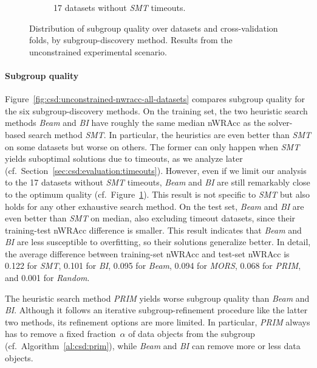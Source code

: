\documentclass{article}
\theoremstyle{definition}
\begin{document}
\begin{figure}[t]
\begin{subfigure}[t]{0.48\textwidth}
		\caption{17 datasets without \emph{SMT} timeouts.}
		\label{fig:csd:unconstrained-nwracc-no-timeout-datasets}
	\end{subfigure}
	\caption{
		Distribution of subgroup quality over datasets and cross-validation folds, by subgroup-discovery method.
		Results from the unconstrained experimental scenario.
	}
	\label{fig:csd:unconstrained-nwracc}
\end{figure}

\paragraph{Subgroup quality}

Figure~\ref{fig:csd:unconstrained-nwracc-all-datasets} compares subgroup quality for the six subgroup-discovery methods.
On the training set, the two heuristic search methods \emph{Beam} and \emph{BI} have roughly the same median nWRAcc as the solver-based search method \emph{SMT}.
In particular, the heuristics are even better than \emph{SMT} on some datasets but worse on others.
The former can only happen when \emph{SMT} yields suboptimal solutions due to timeouts, as we analyze later (cf.~Section~\ref{sec:csd:evaluation:timeouts}).
However, even if we limit our analysis to the 17 datasets without \emph{SMT} timeouts, \emph{Beam} and \emph{BI} are still remarkably close to the optimum quality (cf.~Figure~\ref{fig:csd:unconstrained-nwracc-no-timeout-datasets}).
This result is not specific to \emph{SMT} but also holds for any other exhaustive search method.
On the test set, \emph{Beam} and \emph{BI} are even better than \emph{SMT} on median, also excluding timeout datasets, since their training-test nWRAcc difference is smaller.
This result indicates that \emph{Beam} and \emph{BI} are less susceptible to overfitting, so their solutions generalize better.
In detail, the average difference between training-set nWRAcc and test-set nWRAcc is 0.122 for \emph{SMT}, 0.101 for \emph{BI}, 0.095 for \emph{Beam}, 0.094 for \emph{MORS}, 0.068 for \emph{PRIM}, and 0.001 for \emph{Random}.

The heuristic search method \emph{PRIM} yields worse subgroup quality than \emph{Beam} and \emph{BI}.
Although it follows an iterative subgroup-refinement procedure like the latter two methods, its refinement options are more limited.
In particular, \emph{PRIM} always has to remove a fixed fraction~$\alpha$ of data objects from the subgroup (cf.~Algorithm~\ref{al:csd:prim}), while \emph{Beam} and \emph{BI} can remove more or less data objects.
\end{document}
